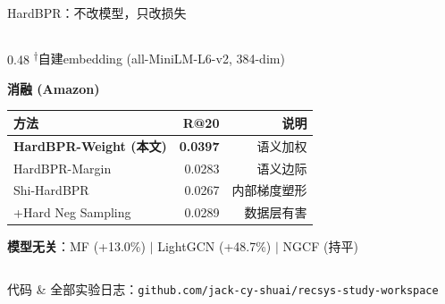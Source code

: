 \documentclass[11pt,aspectratio=169]{beamer}
\begin{document}
\begin{frame}{HardBPR：不改模型，只改损失}
\begin{columns}[T]
\begin{column}{0.48\textwidth}
{\tiny \textsuperscript{$\dagger$}自建embedding (all-MiniLM-L6-v2, 384-dim)}

\vspace{3mm}
\textbf{消融 (Amazon)}

\vspace{2mm}
\footnotesize
\begin{tabular}{lrr}
\toprule
方法 & R@20 & 说明 \\
\midrule
\textbf{HardBPR-Weight (本文)} & \textbf{0.0397} & 语义加权 \\
HardBPR-Margin & 0.0283 & 语义边际 \\
Shi-HardBPR~\cite{Shi2024HardBPR} & 0.0267 & 内部梯度塑形 \\
+Hard Neg Sampling & 0.0289 & 数据层有害 \\
\bottomrule
\end{tabular}

\vspace{2mm}
\footnotesize
\textbf{模型无关}：MF (+13.0\%) $|$ LightGCN (+48.7\%) $|$ NGCF (持平)
\end{column}
\end{columns}

\vfill
\tiny 代码 \& 全部实验日志：\texttt{github.com/jack-cy-shuai/recsys-study-workspace}

\end{frame}
\end{document}
